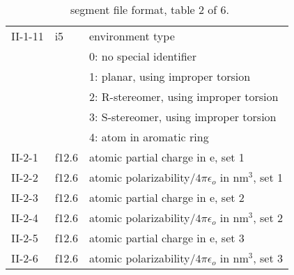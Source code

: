 \begin{table}[htbp]
\begin{center}
\begin{tabular*}{150mm}{p{15mm}p{12mm}l}
II-1-11 & i5     & environment type\\
        &        & 0: no special identifier\\
        &        & 1: planar, using improper torsion\\
        &        & 2: R-stereomer, using improper torsion\\
        &        & 3: S-stereomer, using improper torsion\\
        &        & 4: atom in aromatic ring\\
II-2-1  & f12.6  & atomic partial charge in e, set 1\\
II-2-2  & f12.6  & atomic polarizability/$4\pi\epsilon_o$ in nm$^3$, set 1\\
II-2-3  & f12.6  & atomic partial charge in e, set 2\\
II-2-4  & f12.6  & atomic polarizability/$4\pi\epsilon_o$ in nm$^3$, set 2\\
II-2-5  & f12.6  & atomic partial charge in e, set 3\\
II-2-6  & f12.6  & atomic polarizability/$4\pi\epsilon_o$ in nm$^3$, set 3\\
\hline
\end{tabular*}
\caption{\nwargos\ segment file format, table 2 of 6.\label{tbl:nwaseg2}}
\end{center}
\end{table}


